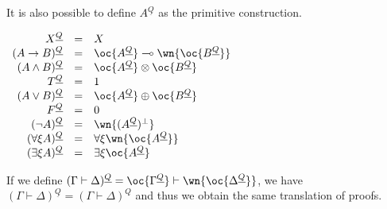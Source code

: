 It is also possible to define \(A^{\underline{Q}}\) as the primitive
construction.

\(\begin{array}{rcl}
X^{\underline{Q}} &  = &  X \\
(A\imp B)^{\underline{Q}} &  = &  \oc{A^{\underline{Q}}}\limp\wn{\oc{B^{\underline{Q}}}} \\
(A\wedge B)^{\underline{Q}} &  = &  \oc{A^{\underline{Q}}}\tens\oc{B^{\underline{Q}}} \\
T^{\underline{Q}} &  = &  \one \\
(A\vee B)^{\underline{Q}} &  = &  \oc{A^{\underline{Q}}}\plus\oc{B^{\underline{Q}}} \\
F^{\underline{Q}} &  = &  \zero \\
(\neg A)^{\underline{Q}} &  = &  \wn{(A^{\underline{Q}})\orth} \\
(\forall\xi A)^{\underline{Q}} &  = &  \forall\xi \wn{\oc{A^{\underline{Q}}}} \\
(\exists\xi A)^{\underline{Q}} &  = &  \exists\xi \oc{A^{\underline{Q}}}
\end{array}\)

If we define
\((\Gamma\vdash\Delta)^{\underline{Q}} = \oc{\Gamma^{\underline{Q}}}\vdash\wn{\oc{\Delta^{\underline{Q}}}}\),
we have
\((\Gamma\vdash\Delta)^{\underline{Q}} = (\Gamma\vdash\Delta)^Q\) and
thus we obtain the same translation of proofs.


